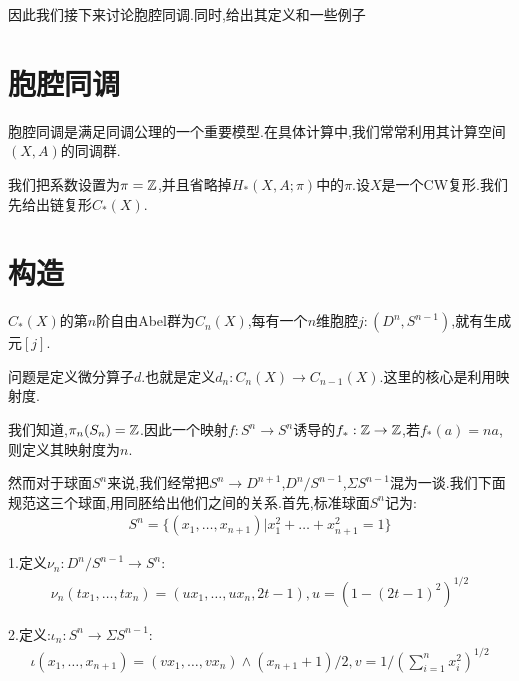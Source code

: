 因此我们接下来讨论胞腔同调.同时,给出其定义和一些例子
\section{胞腔同调}
胞腔同调是满足同调公理的一个重要模型.在具体计算中,我们常常利用其计算空间$(X,A)$的同调群.

我们把系数设置为$\pi=\mathbb{Z}$,并且省略掉$H_*(X,A;\pi)$中的$\pi$.设$X$是一个CW复形.我们先给出链复形$C_*(X)$.
\section{构造}
\begin{definition}
    $C_*(X)$的第$n$阶自由Abel群为$C_n(X)$,每有一个$n$维胞腔$j:(D^n,S^{n-1})$,就有生成元$[j]$.
\end{definition}
问题是定义微分算子$d$.也就是定义$d_n:C_n(X)\to C_{n-1}(X)$.这里的核心是利用映射度.

我们知道,$\pi_n(S_n)=\mathbb{Z}$.因此一个映射$f:S^n\to S^n$诱导的$f_*:\mathbb{Z} \to \mathbb{Z}$,若$f_*(a)=na$,则定义其映射度为$n$.

然而对于球面$S^n$来说,我们经常把$S^n \to D^{n+1}$,$D^n/S^{n-1}$,$\Sigma S^{n-1}$混为一谈.我们下面规范这三个球面,用同胚给出他们之间的关系.首先,标准球面$S^n$记为:
\begin{align*}
    S^n=\{(x_1,\dots,x_{n+1})|x_1^2+\dots+x_{n+1}^2=1\}
\end{align*}

1.定义$\nu_n:D^n/S^{n-1}\to S^n$:
\begin{align*}
    \nu_n(tx_1,\dots,tx_n)=(ux_1,\dots,ux_n,2t-1), u=(1-(2t-1)^2)^{1/2}
\end{align*}

2.定义:$\iota_n:S^n \to \Sigma S^{n-1}$:
\begin{align*}
    \iota(x_1,\dots,x_{n+1})=(vx_1,\dots,vx_n)\wedge (x_{n+1}+1)/2, v=1/(\sum_{i=1}^n x_i^2)^{1/2}
\end{align*}

